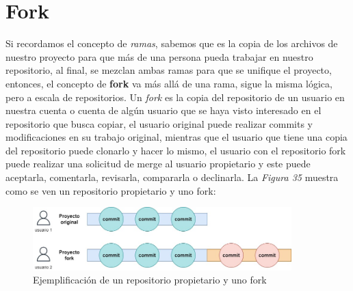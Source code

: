 \section{Fork}
\hspace{0.55cm}Si recordamos el concepto de \textit{ramas}, sabemos que es la copia de los archivos de nuestro proyecto para que más de una persona pueda trabajar en nuestro repositorio, al final, se mezclan ambas ramas para que se unifique el proyecto, entonces, el concepto de \textbf{fork} va más allá de una rama, sigue la misma lógica, pero a escala de repositorios. Un \textit{fork} es la copia del repositorio de un usuario en nuestra cuenta o cuenta de algún usuario que se haya visto interesado en el repositorio que busca copiar, el usuario original puede realizar commits y modificaciones en su trabajo original, mientras que el usuario que tiene una copia del repositorio puede clonarlo y hacer lo mismo, el usuario con el repositorio fork puede realizar una solicitud de merge al usuario propietario y este puede aceptarla, comentarla, revisarla, compararla o declinarla. La \textit{Figura 35} muestra como se ven un repositorio propietario y uno fork:
\begin{figure}[H]
    \begin{center}
        \caption{Ejemplificación de un repositorio propietario y uno fork}
        \label{fig: 35}
        \includegraphics[width=10cm]{capturas/fork1.jpg}
    \end{center}
\end{figure}

